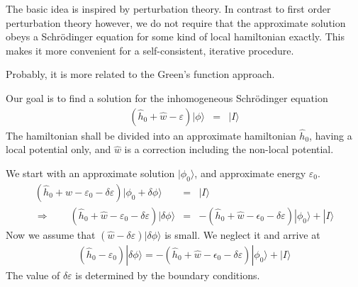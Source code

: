 \documentclass[11pt,a4paper]{report}
\begin{document}
The basic idea is inspired by perturbation theory.  In contrast to
first order perturbation theory however, we do not require that the
approximate solution obeys a Schr\"odinger equation for some kind of
local hamiltonian exactly. This makes it more convenient for a
self-consistent, iterative procedure.

Probably, it is more related to the Green's function approach.

Our goal is to find a solution for the inhomogeneous Schr\"odinger
equation
\begin{eqnarray*}
\left(\hat{h}_0+\hat{w}-\varepsilon\right)
|\phi\rangle&=&|I\rangle
\end{eqnarray*}
The hamiltonian shall be divided into an approximate hamiltonian
$\hat{h}_0$, having a local potential only, and $\hat{w}$ is a
correction including the non-local potential.

We start with an approximate solution $|\phi_0\rangle$, and
approximate energy $\varepsilon_0$. 
\begin{eqnarray*}
\left(\hat{h}_0+\hat{w}-\varepsilon_0-\delta\varepsilon\right)
|\phi_0+\delta\phi\rangle&=&|I\rangle
\\
\Rightarrow\qquad
\left(\hat{h}_0+\hat{w}-\varepsilon_0-\delta\varepsilon\right)
|\delta\phi\rangle
&=&-\left(\hat{h}_0+\hat{w}-\epsilon_0-\delta\varepsilon\right)
|\phi_0\rangle
+|I\rangle
\end{eqnarray*}
Now we assume that $(\hat{w}-\delta\varepsilon)|\delta\phi\rangle$
is small. We neglect it and arrive at
\begin{eqnarray*}
\left(\hat{h}_0-\varepsilon_0\right)
|\delta\phi\rangle
=-\left(\hat{h}_0+\hat{w}-\epsilon_0-\delta\varepsilon\right)
|\phi_0\rangle
+|I\rangle
\end{eqnarray*}
The value of $\delta\varepsilon$ is determined by the boundary
conditions. 
\end{document}

